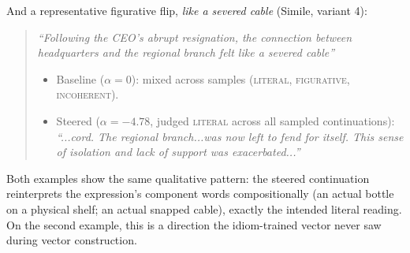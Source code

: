 \documentclass[11pt]{article}
\begin{document}
And a representative figurative flip, \emph{like a severed cable} (Simile, variant 4):

\begin{quote}
\emph{``Following the CEO's abrupt resignation, the connection between headquarters and
the regional branch felt like a severed cable''}
\begin{itemize}[nosep]
\item Baseline ($\alpha=0$): mixed across samples (\textsc{literal}, \textsc{figurative},
\textsc{incoherent}).
\item Steered ($\alpha=-4.78$, judged \textsc{literal} across all sampled continuations):
\emph{``...cord. The regional branch...was now left to fend for itself. This sense of
isolation and lack of support was exacerbated...''}
\end{itemize}
\end{quote}

Both examples show the same qualitative pattern: the steered continuation reinterprets the
expression's component words compositionally (an actual bottle on a physical shelf; an
actual snapped cable), exactly the intended literal reading. On the second example, this
is a direction the idiom-trained vector never saw during vector construction.
\end{document}
